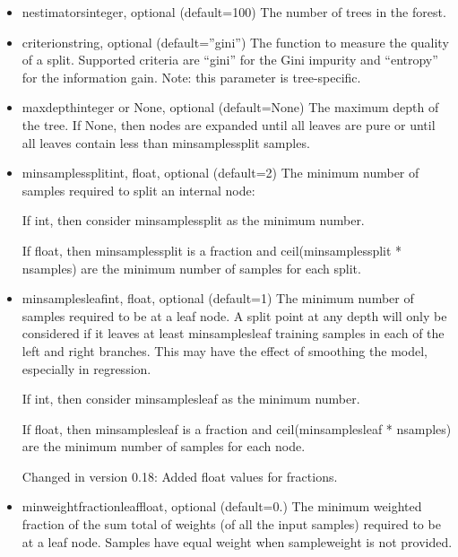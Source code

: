 \documentclass[12pt]{article}
\begin{document}
\begin{itemize}
\item
n\textunderscore estimatorsinteger, optional (default=100)
The number of trees in the forest.

\item
criterionstring, optional (default=”gini”)
The function to measure the quality of a split. Supported criteria are “gini” for the Gini impurity and “entropy” for the information gain. Note: this parameter is tree-specific.

\item
max\textunderscore depthinteger or None, optional (default=None)
The maximum depth of the tree. If None, then nodes are expanded until all leaves are pure or until all leaves contain less than min\textunderscore samples\textunderscore split samples.

\item
min\textunderscore samples\textunderscore splitint, float, optional (default=2)
The minimum number of samples required to split an internal node:

If int, then consider min\textunderscore samples\textunderscore split as the minimum number.

If float, then min\textunderscore samples\textunderscore split is a fraction and ceil(min\textunderscore samples\textunderscore split * n\textunderscore samples) are the minimum number of samples for each split.

\item
min\textunderscore samples\textunderscore leafint, float, optional (default=1)
The minimum number of samples required to be at a leaf node. A split point at any depth will only be considered if it leaves at least min\textunderscore samples\textunderscore leaf training samples in each of the left and right branches. This may have the effect of smoothing the model, especially in regression.

If int, then consider min\textunderscore samples\textunderscore leaf as the minimum number.

If float, then min\textunderscore samples\textunderscore leaf is a fraction and ceil(min\textunderscore samples\textunderscore leaf * n\textunderscore samples) are the minimum number of samples for each node.

Changed in version 0.18: Added float values for fractions.

\item
min\textunderscore weight\textunderscore fraction\textunderscore leaffloat, optional (default=0.)
The minimum weighted fraction of the sum total of weights (of all the input samples) required to be at a leaf node. Samples have equal weight when sample\textunderscore weight is not provided.


\end{itemize}
\end{document}
